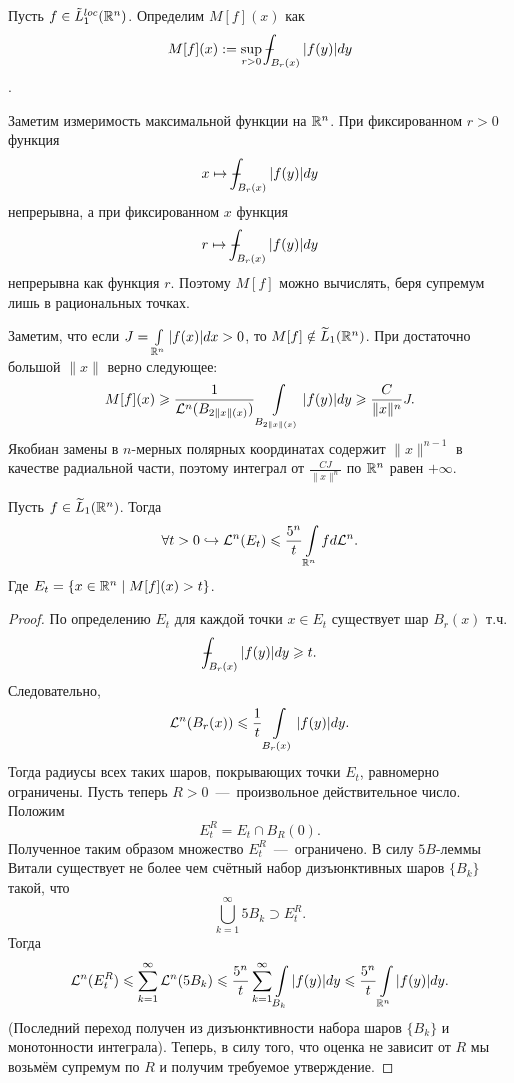 \begin{definition}
    Пусть $f \in \Tilde{L}_1^{loc}(\mathbb{R}^n)$. Определим $M[f](x)$ как \[M[f](x) := \sup\limits_{r > 0}\dashint_{B_r(x)} |f(y)|dy\].
\end{definition}
\begin{note}
    Заметим измеримость максимальной функции на $\mathbb{R}^n$. При фиксированном $r > 0$ функция \[x \mapsto \dashint_{B_r(x)}|f(y)|dy\]
    непрерывна, а при фиксированном $x$ функция \[r \mapsto \dashint_{B_r(x)}|f(y)|dy\] непрерывна как функция $r$.	
    Поэтому $M[f]$ можно вычислять, беря супремум лишь в рациональных точках.
\end{note}
\begin{note}
    Заметим, что если $J = \int\limits_{\mathbb{R}^n} |f(x)|dx > 0$, то $M[f] \notin \widetilde{L}_1(\mathbb{R}^n)$. При достаточно большой $\|x\|$ верно следующее: \[M[f](x) \geqslant \dfrac{1}{\mathcal{L}^n(B_{2\|x\|(x)})}\int\limits_{B_{2\|x\|(x)}}|f(y)|dy \geqslant \dfrac{C}{\|x\|^n}J.\]
    Якобиан замены в $n$-мерных полярных координатах содержит $\|x\|^{n - 1}$ в качестве радиальной части, поэтому интеграл от $\frac{CJ}{\|x\|^n}$ по $\mathbb{R}^n$ равен $+\infty$.
\end{note}
\begin{lemma}
    Пусть $f \in \widetilde{L}_1(\mathbb{R}^n)$. Тогда \[\forall t > 0 \hookrightarrow  \mathcal{L}^n(E_t) \leqslant \dfrac{5^n}{t}\int\limits_{\mathbb{R}^n}fd\mathcal{L}^n.\]
 Где $E_t = \{x \in \mathbb{R}^n \mid M[f](x) > t\}$.
\end{lemma}
\begin{proof}
    По определению $E_t$ для каждой точки $x \in E_t$ существует шар $B_r(x)$ т.ч. \[\dashint_{B_r(x)}|f(y)|dy \geq t.\]
    Следовательно, \[\mathcal{L}^n(B_r(x)) \leqslant \dfrac{1}{t}\int\limits_{B_r(x)}|f(y)|dy.\]
    Тогда радиусы всех таких шаров, покрывающих точки $E_t$, равномерно ограничены. Пусть теперь $R > 0$~---~произвольное действительное число. Положим \[E_t^R = E_t \cap B_R(0).\]
    Полученное таким образом множество $E_t^R$~---~ограничено. В силу $5B$-леммы Витали существует не более чем счётный набор дизъюнктивных шаров $\{B_k\}$ такой, что \[\bigcup\limits_{k = 1}^\infty 5B_k \supset E_t^R.\]
    Тогда \[\mathcal{L}^n(E_t^R) \leqslant \sum\limits_{k = 1}^\infty \mathcal{L}^n(5B_k) \leqslant \dfrac{5^n}{t}\sum\limits_{k = 1}^\infty \int\limits_{B_k}|f(y)|dy \leqslant \dfrac{5^n}{t}\int\limits_{\mathbb{R}^n}|f(y)|dy.\]
    (Последний переход получен из дизъюнктивности набора шаров $\{B_k\}$ и монотонности интеграла). Теперь, в силу того, что оценка не зависит от $R$ мы возьмём супремум по $R$ и получим требуемое утверждение.
\end{proof}
